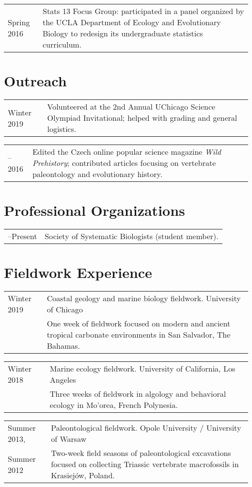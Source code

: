 \documentclass[10pt]{article}
\begin{document}
\begin{tabularx}{\textwidth}{>{\raggedleft\arraybackslash}p{2.2cm} X}
Spring 2016 & Stats 13 Focus Group: participated in a panel organized by the UCLA Department of Ecology and Evolutionary Biology to redesign its undergraduate statistics curriculum.
\end{tabularx}

\section*{Outreach}

\begin{tabularx}{\textwidth}{>{\raggedleft\arraybackslash}p{2.2cm} X}
Winter 2019 & Volunteered at the 2nd Annual UChicago Science Olympiad Invitational; helped with grading and general logistics.
\end{tabularx}
\begin{tabularx}{\textwidth}{>{\raggedleft\arraybackslash}p{2.2cm} X}
2015--2016 & Edited the Czech online popular science magazine \textit{Wild Prehistory}; contributed articles focusing on vertebrate paleontology and evolutionary history.
\end{tabularx}

\section*{Professional Organizations}

\begin{tabularx}{\textwidth}{>{\raggedleft\arraybackslash}p{2.2cm} X}
2017--Present & Society of Systematic Biologists (student member).
\end{tabularx}

\section*{Fieldwork Experience}

\begin{tabularx}{\textwidth}{>{\raggedleft\arraybackslash}p{2.2cm} X}
Winter 2019 & Coastal geology and marine biology fieldwork. University of Chicago \\
& One week of fieldwork focused on modern and ancient tropical carbonate environments in San Salvador, The Bahamas.
\end{tabularx}
\begin{tabularx}{\textwidth}{>{\raggedleft\arraybackslash}p{2.2cm} X}
Winter 2018 & Marine ecology fieldwork. University of California, Los Angeles \\
& Three weeks of fieldwork in algology and behavioral ecology in Mo'orea, French Polynesia.
\end{tabularx}
\begin{tabularx}{\textwidth}{>{\raggedleft\arraybackslash}p{2.2cm} X}
Summer 2013, & Paleontological fieldwork. Opole University / University of Warsaw \\
Summer 2012 & Two-week field seasons of paleontological excavations focused on collecting Triassic vertebrate macrofossils in Krasiej\'{o}w, Poland.
\end{tabularx}
\end{document}
